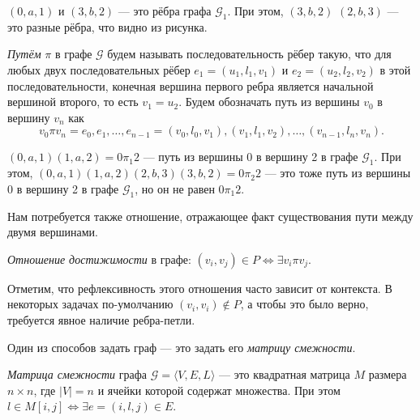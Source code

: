 \begin{example}
$(0,a,1)$  и $(3,b,2)$ --- это рёбра графа $\mathcal{G}_1$. При этом, $(3,b,2)$ $(2,b,3)$ --- это разные рёбра, что видно из рисунка.
\end{example}

\begin{definition}
  \textit{Путём} $\pi$ в графе $\mathcal{G}$ будем называть последовательность рёбер такую, что для любых двух последовательных рёбер $e_1=(u_1,l_1,v_1)$ и $e_2=(u_2,l_2,v_2)$ в этой последовательности, конечная вершина первого ребра является начальной вершиной второго, то есть $v_1 = u_2$. Будем обозначать путь из вершины $v_0$ в вершину $v_n$ как $$v_0 \pi v_n = e_0,e_1, \dots, e_{n-1} = (v_0, l_0, v_1),(v_1,l_1,v_2),\dots,(v_{n-1},l_n,v_n).$$

\begin{center}
  \end{center}
\end{definition}

\begin{example}
$(0,a,1)(1,a,2) = 0\pi_1 2$  --- путь из вершины 0 в вершину 2 в графе $\mathcal{G}_1$.
При этом, $(0,a,1)(1,a,2)(2,b,3)(3,b,2) = 0\pi_2 2$ --- это тоже путь из вершины 0 в вершину 2 в графе $\mathcal{G}_1$, но он не равен $0\pi_1 2$.
\end{example}

Нам потребуется также отношение, отражающее факт существования пути между двумя вершинами.

\begin{definition}\label{def:reach}
  \textit{Отношение достижимости} в графе:
  $(v_i,v_j) \in P \iff \exists v_i \pi v_j$.
\end{definition}

Отметим, что рефлексивность этого отношения часто зависит от контекста.
В некоторых задачах по-умолчанию $(v_i,v_i) \notin P$, а чтобы это было верно, требуется явное наличие ребра-петли.

Один из способов задать граф --- это задать его \textit{матрицу смежности}.

\begin{definition}
  \textit{Матрица смежности} графа $\mathcal{G}=\langle V,E,L \rangle$ --- это квадратная матрица $M$ размера $n \times n$, где $|V| = n$ и ячейки которой содержат множества.
  При этом $l \in M[i,j] \iff \exists e = (i,l,j) \in E$.
\end{definition}

